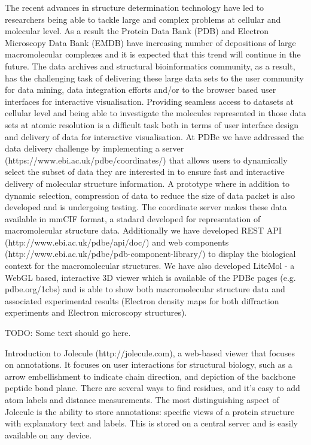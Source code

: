 \documentclass[a4paper]{article}
\begin{document}

The recent advances in structure determination technology have led to researchers being able to tackle large and complex problems at cellular and molecular level. As a result the Protein Data Bank (PDB) and Electron Microscopy Data Bank (EMDB) have increasing number of depositions of large macromolecular complexes and it is expected that this trend will continue in the future. The data archives and structural bioinformatics community, as a result, has the challenging task of delivering these large data sets to the user community for data mining, data integration efforts and/or to the browser based user interfaces for interactive visualisation. Providing seamless access to datasets at cellular level and being able to investigate the molecules represented in those data sets at atomic resolution is a difficult task both in terms of user interface design and delivery of data for interactive visualisation. At PDBe we have addressed the data delivery challenge by implementing a server (https://www.ebi.ac.uk/pdbe/coordinates/) that allows users to dynamically select the subset of data they are interested in to ensure fast and interactive delivery of molecular structure information. A prototype where in addition to dynamic selection, compression of data to reduce the size of data packet is also developed and is undergoing testing. The coordinate server makes these data available in mmCIF format, a stadard developed for representation of macromolecular structure data. Additionally we have developed REST API (http://www.ebi.ac.uk/pdbe/api/doc/) and web components (http://www.ebi.ac.uk/pdbe/pdb-component-library/) to display the biological context for the macromolecular structures. We have also developed LiteMol - a WebGL based, interactive 3D viewer which is available of the PDBe pages (e.g. pdbe.org/1cbs) and is able to show both macromolecular structure data and associated experimental results (Electron density maps for both diffraction experiments and Electron microscopy structures).



TODO: Some text should go here.



Introduction to Jolecule (http://jolecule.com), a web-based viewer that focuses on annotations. It focuses on user interactions for structural biology, such as a  arrow embellishment to indicate chain direction, and depiction of the backbone peptide bond plane. There are several ways to find residues, and it's easy to add atom labels and distance measurements. The most distinguishing aspect of Jolecule is the ability to store annotations: specific views of a protein structure with explanatory text and labels. This is stored on a central server and is easily available on any device.
\end{document}
